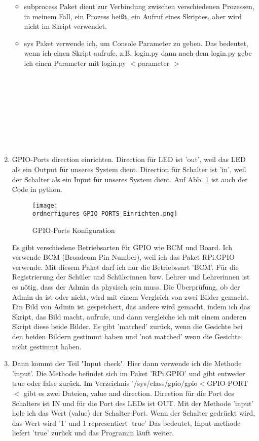 \begin{enumerate}
\begin{itemize}
	 \item subprocess Paket dient zur Verbindung zwischen verschiedenen Prozessen, in meinem Fall, ein Prozess heißt, ein Aufruf eines Skriptes, aber wird nicht im Skript verwendet. 
	 
	 \item sys Paket verwende ich, um Console Parameter zu geben. Das bedeutet, wenn ich einen Skript aufrufe, z.B. login.py dann nach dem login.py gebe ich einen Parameter mit login.py $<$parameter $>$ \\ \\ \\ \\ \\ \\ \\ \\ \\ 
   \end{itemize}
	\item GPIO-Ports direction einrichten. Direction für LED ist 'out', weil das LED als ein Output für unseres System dient. Direction für Schalter ist 'in', weil der Schalter als ein Input für unseres System dient. Auf Abb. \ref{fig:GPIO-Ports Konfiguration} ist auch der Code in python. 
	\begin{figure}[H]
		\texttt{[image: \\ordnerfigures GPIO\_PORTS\_Einrichten.png]}
		\caption{GPIO-Ports Konfiguration}
		\label{fig:GPIO-Ports Konfiguration}
	\end{figure}
	Es gibt verschiedene Betriebsarten für GPIO wie BCM und Board.
	Ich verwende BCM (Broadcom Pin Number), weil ich das Paket RPi.GPIO verwende. Mit diesem Paket darf ich nur die Betriebssart 'BCM'. 
	\cite{gpiomode}
	Für die Registrierung der Schüler und Schülerinnen bzw. Lehrer und Lehrerinnen ist es nötig, dass der Admin da physisch sein muss. Die Überprüfung, ob der Admin da ist oder nicht,  wird mit einem Vergleich von zwei Bilder gemacht. Ein Bild von Admin ist gespeichert, das andere wird gemacht, indem ich das Skript, das Bild macht, aufrufe, und dann vergleiche ich mit einem anderen Skript diese beide Bilder. Es gibt 'matched' zurück, wenn die Gesichte bei den beiden Bildern gestimmt haben und 'not matched' wenn die Gesichte nicht gestimmt haben.
	\item Dann kommt der Teil "Input check". 
	Hier dann verwende ich die Methode 'input'. Die Methode befindet sich im Paket 'RPi.GPIO' und gibt entweder true oder false zurück. 
	Im Verzeichnis '/sys/class/gpio/gpio$<$GPIO-PORT$<$ gibt es zwei Dateien, value and direction. Direction für die Port des Schalters ist IN und für die Port des LEDs ist OUT. Mit der Methode 'input' hole ich das Wert (value) der Schalter-Port. Wenn der Schalter gedrückt wird, das Wert wird '1' und 1 representiert 'true' Das bedeutet, Input-methode liefert 'true' zurück und das Programm läuft weiter.
	

\end{enumerate}
